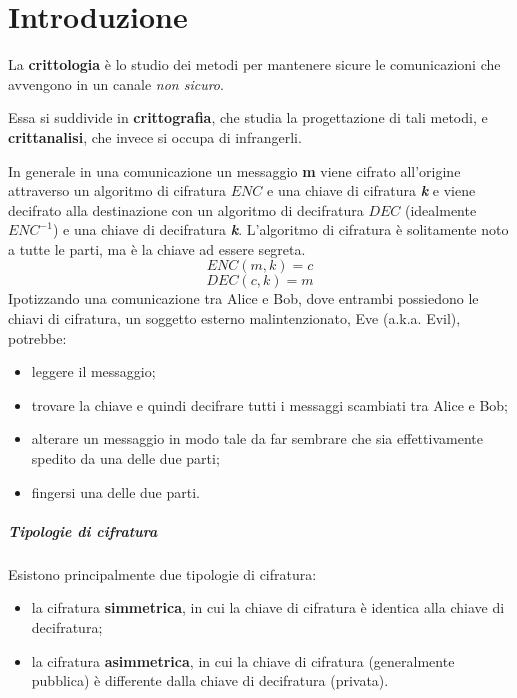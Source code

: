 \documentclass[a4paper]{report}
\begin{document}
\maketitle
\tableofcontents

\chapter{Introduzione}
La \textbf{crittologia} è lo studio dei metodi per mantenere sicure le comunicazioni che avvengono in un canale \textit{non sicuro}.

Essa si suddivide in \textbf{crittografia}, che studia la progettazione di tali metodi, e \textbf{crittanalisi}, che invece si occupa di infrangerli.
\begin{center}
\end{center}
In generale in una comunicazione un messaggio \textbf{m} viene cifrato all'origine attraverso un algoritmo di cifratura \textbf{\(ENC\)} e una chiave di cifratura \textbf{\textit{k}} e viene decifrato alla destinazione con un algoritmo di decifratura \textbf{\(DEC\)} (idealmente \(ENC^{-1}\)) e una chiave di decifratura \textbf{\textit{k}}. L'algoritmo di cifratura è solitamente noto a tutte le parti, ma è la chiave ad essere segreta.
\[ENC(m,k)=c\]
\[DEC(c,k)=m\]
Ipotizzando una comunicazione tra Alice e Bob, dove entrambi possiedono le chiavi di cifratura, un soggetto esterno malintenzionato, Eve (a.k.a. Evil), potrebbe:
\begin{itemize}
\item leggere il messaggio;
\item trovare la chiave e quindi decifrare tutti i messaggi scambiati tra Alice e Bob;
\item alterare un messaggio in modo tale da far sembrare che sia effettivamente spedito da una delle due parti;
\item fingersi una delle due parti.
\end{itemize}
\paragraph{Tipologie di cifratura}
Esistono principalmente due tipologie di cifratura:
\begin{itemize}
\item la cifratura \textbf{simmetrica}, in cui la chiave di cifratura è identica alla chiave di decifratura;
\item la cifratura \textbf{asimmetrica}, in cui la chiave di cifratura (generalmente pubblica) è differente dalla chiave di decifratura (privata).
\end{itemize}
\end{document}
